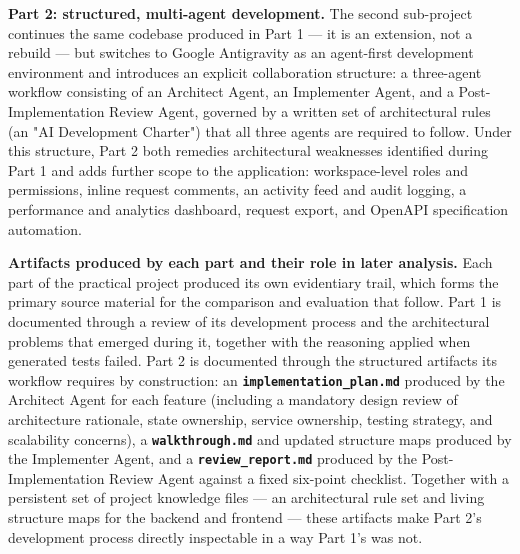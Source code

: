 \textbf{Part 2: structured, multi-agent development.} The second sub-project continues the same codebase produced in Part 1 --- it is an extension, not a rebuild --- but switches to Google Antigravity as an agent-first development environment and introduces an explicit collaboration structure: a three-agent workflow consisting of an Architect Agent, an Implementer Agent, and a Post-Implementation Review Agent, governed by a written set of architectural rules (an "AI Development Charter") that all three agents are required to follow. Under this structure, Part 2 both remedies architectural weaknesses identified during Part 1 and adds further scope to the application: workspace-level roles and permissions, inline request comments, an activity feed and audit logging, a performance and analytics dashboard, request export, and OpenAPI specification automation.

\textbf{Artifacts produced by each part and their role in later analysis.} Each part of the practical project produced its own evidentiary trail, which forms the primary source material for the comparison and evaluation that follow. Part 1 is documented through a review of its development process and the architectural problems that emerged during it, together with the reasoning applied when generated tests failed. Part 2 is documented through the structured artifacts its workflow requires by construction: an \textbf{\texttt{implementation\_plan.md}} produced by the Architect Agent for each feature (including a mandatory design review of architecture rationale, state ownership, service ownership, testing strategy, and scalability concerns), a \textbf{\texttt{walkthrough.md}} and updated structure maps produced by the Implementer Agent, and a \textbf{\texttt{review\_report.md}} produced by the Post-Implementation Review Agent against a fixed six-point checklist. Together with a persistent set of project knowledge files --- an architectural rule set and living structure maps for the backend and frontend --- these artifacts make Part 2's development process directly inspectable in a way Part 1's was not.

